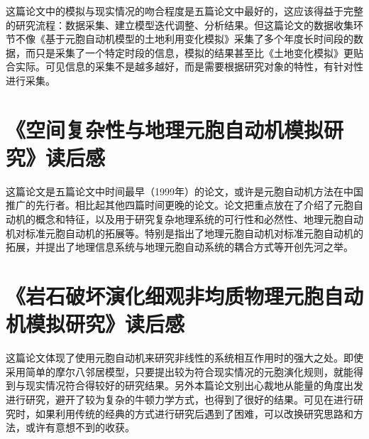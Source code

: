 \documentclass[UTF8]{ctexart}
\begin{document}
这篇论文中的模拟与现实情况的吻合程度是五篇论文中最好的，这应该得益于完整的研究流程：数据采集、建立模型迭代调整、分析结果。但这篇论文的数据收集环节不像《基于元胞自动机模型的土地利用变化模拟》采集了多个年度长时间段的数据，而只是采集了一个特定时段的信息，模拟的结果甚至比《土地变化模拟》更贴合实际。可见信息的采集不是越多越好，而是需要根据研究对象的特性，有针对性进行采集。

\section{《空间复杂性与地理元胞自动机模拟研究》读后感}

这篇论文是五篇论文中时间最早（1999年）的论文，或许是元胞自动机方法在中国推广的先行者。相比起其他四篇时间更晚的论文。论文把重点放在了介绍了元胞自动机的概念和特征，以及用于研究复杂地理系统的可行性和必然性、地理元胞自动机对标准元胞自动机的拓展等。特别是指出了地理元胞自动机对标准元胞自动机的拓展，并提出了地理信息系统与地理元胞自动系统的耦合方式等开创先河之举。

\section{《岩石破坏演化细观非均质物理元胞自动机模拟研究》读后感}

这篇论文体现了使用元胞自动机来研究非线性的系统相互作用时的强大之处。即使采用简单的摩尔八邻居模型，只要提出较为符合现实情况的元胞演化规则，就能得到与现实情况符合得较好的研究结果。另外本篇论文别出心裁地从能量的角度出发进行研究，避开了较为复杂的牛顿力学方式，也得到了很好的结果。可见在进行研究时，如果利用传统的经典的方式进行研究后遇到了困难，可以改换研究思路和方法，或许有意想不到的收获。
\end{document}
